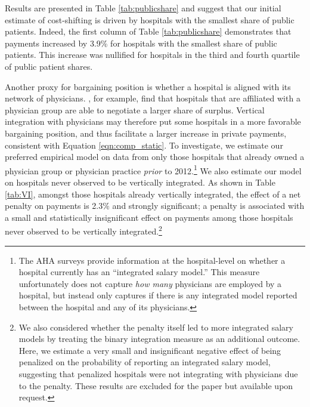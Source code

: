\documentclass[12pt]{article}
\begin{document}
Results are presented in Table \ref{tab:publicshare} and suggest that our initial estimate of cost-shifting is driven by hospitals with the smallest share of public patients. Indeed, the first column of Table \ref{tab:publicshare} demonstrates that payments increased by 3.9\% for hospitals with the smallest share of public patients. This increase was nullified for hospitals in the third and fourth quartile of public patient shares.

Another proxy for bargaining position is whether a hospital is aligned with its network of physicians. \cite{lewis2015}, for example, find that hospitals that are affiliated with a physician group are able to negotiate a larger share of surplus. Vertical integration with physicians may therefore put some hospitals in a more favorable bargaining position, and thus facilitate a larger increase in private payments, consistent with Equation \ref{eqn:comp_static}. To investigate, we estimate our preferred empirical model on data from only those hospitals that already owned a physician group or physician practice \textit{prior} to 2012.\footnote{The AHA surveys provide information at the hospital-level on whether a hospital currently has an ``integrated salary model.'' This measure unfortunately does not capture \textit{how many} physicians are employed by a hospital, but instead only captures if there is any integrated model reported between the hospital and any of its physicians.} We also estimate our model on hospitals never observed to be vertically integrated.  As shown in Table \ref{tab:VI}, amongst those hospitals already vertically integrated, the effect of a net penalty on payments is 2.3$\%$ and strongly significant; a penalty is associated with a small and statistically insignificant effect on payments among those hospitals never observed to be vertically integrated.\footnote{We also considered whether the penalty itself led to more integrated salary models by treating the binary integration measure as an additional outcome. Here, we estimate a very small and insignificant negative effect of being penalized on the probability of reporting an integrated salary model, suggesting that penalized hospitals were not integrating with physicians due to the penalty. These results are excluded for the paper but available upon request.}
\end{document}
